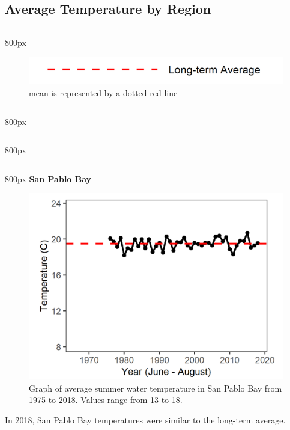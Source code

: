 \documentclass[
]{book}
\begin{document}
\hypertarget{average-temperature-by-region-1}{%
\subsection{Average Temperature by Region}\label{average-temperature-by-region-1}}

\begin{column}{800px\textwidth}
\begin{figure}
\includegraphics[width=15.25in]{figures/mline} \caption{mean is represented by a dotted red line}\label{fig:unnamed-chunk-56}
\end{figure}
\end{column}

\begin{column}{800px\textwidth}
\end{column}

\begin{column}{800px\textwidth}
\end{column}

\begin{column}{800px\textwidth}
\textbf{San Pablo Bay}

\begin{figure}
\includegraphics[width=15.25in]{figures/temp_splsummer} \caption{Graph of average summer water temperature in San Pablo Bay from 1975 to 2018. Values range from 13 to 18.}\label{fig:unnamed-chunk-57}
\end{figure}

In 2018, San Pablo Bay temperatures were similar to the long-term average.
\end{column}
\end{document}
